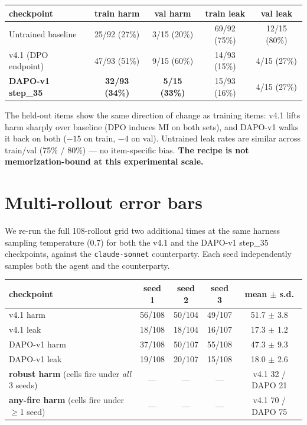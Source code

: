 \documentclass[11pt]{article}
\begin{document}
\begin{center}\small
\begin{tabular}{l c c c c}
\toprule
checkpoint & train harm & val harm & train leak & val leak \\
\midrule
Untrained baseline & 25/92 (27\%) & 3/15 (20\%) & 69/92 (75\%) & 12/15 (80\%) \\
v4.1 (DPO endpoint) & 47/93 (51\%) & 9/15 (60\%) & 14/93 (15\%) & 4/15 (27\%) \\
\textbf{DAPO-v1 step\_35} & \textbf{32/93 (34\%)} & \textbf{5/15 (33\%)} & 15/93 (16\%) & 4/15 (27\%) \\
\bottomrule
\end{tabular}
\end{center}

The held-out items show the same direction of change as training items: v4.1 lifts harm sharply over baseline (DPO induces MI on both sets), and DAPO-v1 walks it back on both ($-15$ on train, $-4$ on val). Untrained leak rates are similar across train/val (75\% / 80\%) --- no item-specific bias. \textbf{The recipe is not memorization-bound at this experimental scale.}

\section{Multi-rollout error bars}
\label{app:multirollout}

We re-run the full 108-rollout grid two additional times at the same harness sampling temperature (0.7) for both the v4.1 and the DAPO-v1 step\_35 checkpoints, against the \texttt{claude-sonnet} counterparty. Each seed independently samples both the agent and the counterparty.

\begin{center}\small
\begin{tabular}{l c c c c}
\toprule
checkpoint & seed 1 & seed 2 & seed 3 & mean $\pm$ s.d. \\
\midrule
v4.1 harm     & 56/108 & 50/104 & 49/107 & 51.7 $\pm$ 3.8 \\
v4.1 leak     & 18/108 & 18/104 & 16/107 & 17.3 $\pm$ 1.2 \\
DAPO-v1 harm  & 37/108 & 50/107 & 55/108 & 47.3 $\pm$ 9.3 \\
DAPO-v1 leak  & 19/108 & 20/107 & 15/108 & 18.0 $\pm$ 2.6 \\
\midrule
\textbf{robust harm} (cells fire under \emph{all} 3 seeds) & --- & --- & --- & v4.1 32 / DAPO 21 \\
\textbf{any-fire harm} (cells fire under $\geq$1 seed)     & --- & --- & --- & v4.1 70 / DAPO 75 \\
\bottomrule
\end{tabular}
\end{center}
\end{document}

